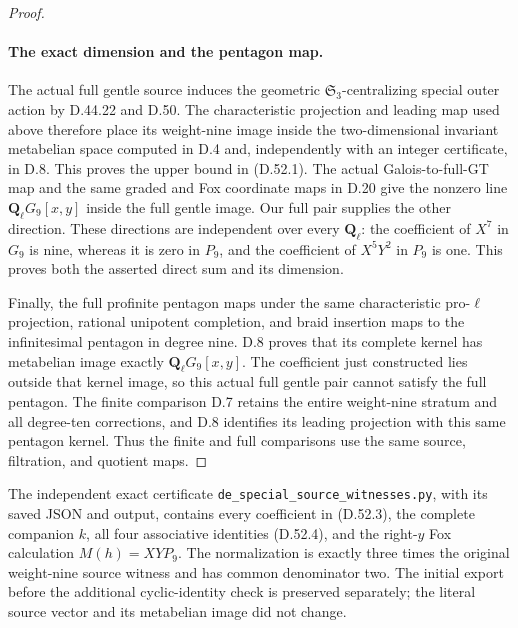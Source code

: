 \begin{proof}
\paragraph{The exact dimension and the pentagon map.}
The actual full gentle source induces the geometric
\(\mathfrak S_3\)-centralizing special outer action by
D.44.22 and D.50. The characteristic projection and leading
map used above therefore place its weight-nine image inside
the two-dimensional invariant metabelian space computed in
D.4 and, independently with an integer certificate, in D.8.
This proves the upper bound in \textup{(D.52.1)}.
The actual Galois-to-full-GT map and the same graded and Fox
coordinate maps in D.20 give the nonzero line
\(\mathbf Q_\ell G_9[x,y]\) inside the full gentle image.
Our full pair supplies the other direction. These directions
are independent over every \(\mathbf Q_\ell\): the
coefficient of \(X^7\) in \(G_9\) is nine, whereas it is
zero in \(P_9\), and the coefficient of \(X^5Y^2\) in
\(P_9\) is one. This proves both the asserted direct sum
and its dimension.

Finally, the full profinite pentagon maps under the same
characteristic pro-\(\ell\) projection, rational unipotent
completion, and braid insertion maps to the infinitesimal
pentagon in degree nine. D.8 proves that its complete kernel
has metabelian image exactly \(\mathbf Q_\ell G_9[x,y]\).
The coefficient just constructed lies outside that kernel
image, so this actual full gentle pair cannot satisfy the
full pentagon. The finite comparison D.7 retains the entire
weight-nine stratum and all degree-ten corrections, and
D.8 identifies its leading projection with this same
pentagon kernel. Thus the finite and full comparisons use
the same source, filtration, and quotient maps.
\end{proof}

The independent exact certificate
\texttt{de\_special\_source\_witnesses.py}, with its saved
JSON and output, contains every coefficient in
\textup{(D.52.3)}, the complete companion \(k\), all four
associative identities \textup{(D.52.4)}, and the right-\(y\)
Fox calculation \(M(h)=XY P_9\). The normalization is exactly
three times the original weight-nine source witness and has
common denominator two. The initial export before the
additional cyclic-identity check is preserved separately;
the literal source vector and its metabelian image did not
change.
